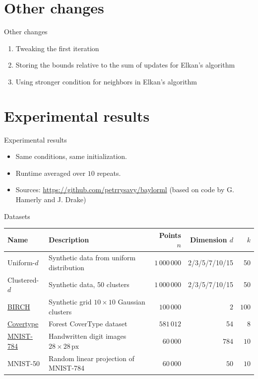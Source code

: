 \documentclass[10pt, compress]{beamer}
\begin{document}
\section{Other changes}

\begin{frame}{Other changes}
  \begin{enumerate}
    \item Tweaking the first iteration
    \item Storing the bounds relative to the sum of updates for Elkan's algorithm
    \item Using stronger condition for neighbors in Elkan's algorithm
  \end{enumerate}
\end{frame}

\section{Experimental results}

\begin{frame}{Experimental results}
  \begin{itemize}
    \item Same conditions, same initialization.
    \item Runtime averaged over $10$ repeats.
    \item Sources: \url{https://github.com/petrrysavy/baylorml} (based on code by G. Hamerly and J. Drake)
  \end{itemize}
\end{frame}

\begin{frame}{Datasets}
  \small
\centering
\label{tab:datasets}
\begin{tabularx}{\textwidth}{lXrrr}
\hline
Name & Description & Points $n$ & Dimension $d$ & $k$ \\
\hline
Uniform-$d$ & Synthetic data from uniform distribution & $1 \, 000 \, 000$ & 2/3/5/7/10/15 & 50 \\
Clustered-$d$ & Synthetic data, 50 clusters & $1 \, 000 \, 000$ & 2/3/5/7/10/15 & 50 \\
\href{http://cs.joensuu.fi/sipu/datasets/}{BIRCH} & Synthetic grid $10\times 10$ Gaussian clusters & $100 \, 000$ & $2$ & $100$ \\
\href{https://archive.ics.uci.edu/ml/datasets/Covertype}{Covertype} & Forest CoverType dataset & $581 \, 012$ & 54 & 8 \\
\href{http://yann.lecun.com/exdb/mnist/}{MNIST-784} & Handwritten digit images $28\times 28\,\mathrm{px}$ & $60 \, 000$ & $784$ & $10$ \\
MNIST-50 & Random linear projection of MNIST-784 & $60 \, 000$ & $50$ & $10$ \\
\hline
\end{tabularx}
\end{frame}
\end{document}
